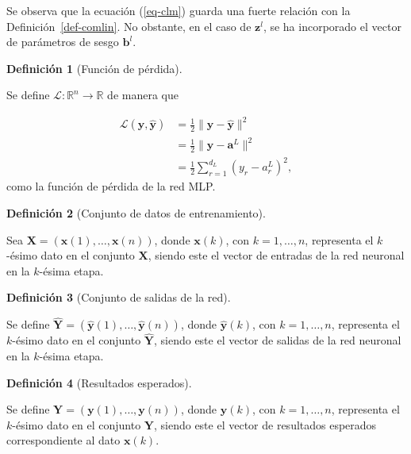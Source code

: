 \documentclass[
  us-letterpaper,
]{scrreprt}
\theoremstyle{plain}
\theoremstyle{definition}
\newtheorem{definition}{Definición}[chapter]
\theoremstyle{definition}
\theoremstyle{plain}
\theoremstyle{remark}
\begin{document}
Se observa que la ecuación (\ref{eq-clm}) guarda una fuerte relación con
la Definición~\ref{def-comlin}. No obstante, en el caso de
\(\mathbf{z}^l\), se ha incorporado el vector de parámetros de sesgo
\(\mathbf{b}^l\).

\begin{definition}[Función de
pérdida]\protect\hypertarget{def-fperdida}{}\label{def-fperdida}

Se define \(\mathcal L: \mathbb{R}^n \rightarrow \mathbb{R}\) de manera
que

\[\begin{split}\mathcal L(\mathbf y,\mathbf{\hat{y}}) &= \frac{1}{2}\|\mathbf y - \mathbf{\hat{y}}\|^2\\ &= \frac{1}{2} \|\mathbf y - \mathbf a^L\|^2\\ &= \frac{1}{2} \sum_{r=1}^{d_L} (y_r - a_r^L)^2,\end{split}\]
como la función de pérdida de la red MLP.

\end{definition}

\begin{definition}[Conjunto de datos de
entrenamiento]\protect\hypertarget{def-cde}{}\label{def-cde}

Sea \(\mathbf X = (\mathbf x(1), \ldots, \mathbf x(n))\), donde
\(\mathbf x(k)\), con \(k = 1, \ldots, n\), representa el \(k\)-ésimo
dato en el conjunto \(\mathbf X\), siendo este el vector de entradas de
la red neuronal en la \(k\)-ésima etapa.

\end{definition}

\begin{definition}[Conjunto de salidas de la
red]\protect\hypertarget{def-csr}{}\label{def-csr}

Se define
\(\hat{\mathbf Y} = (\hat{\mathbf y}(1), \ldots, \hat{\mathbf y}(n))\),
donde \(\hat{\mathbf y}(k)\), con \(k = 1, \ldots, n\), representa el
\(k\)-ésimo dato en el conjunto \(\hat{\mathbf Y}\), siendo este el
vector de salidas de la red neuronal en la \(k\)-ésima etapa.

\end{definition}

\begin{definition}[Resultados
esperados]\protect\hypertarget{def-re}{}\label{def-re}

Se define \(\mathbf Y = (\mathbf y(1), \ldots, \mathbf y(n))\), donde
\(\mathbf y(k)\), con \(k = 1, \ldots, n\), representa el \(k\)-ésimo
dato en el conjunto \(\mathbf Y\), siendo este el vector de resultados
esperados correspondiente al dato \(\mathbf x(k)\).

\end{definition}
\end{document}
